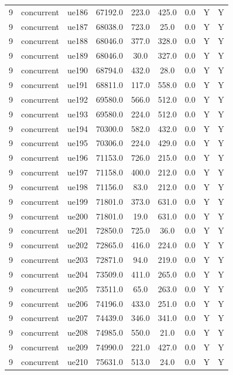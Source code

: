 \begin{table}[ht]
\begin{tabular}{|c|c|c|c|c|c|c|c|c|}
9 & concurrent & ue186 & 67192.0 & 223.0 & 425.0 & 0.0 & Y & Y \\
9 & concurrent & ue187 & 68038.0 & 723.0 & 25.0 & 0.0 & Y & Y \\
9 & concurrent & ue188 & 68046.0 & 377.0 & 328.0 & 0.0 & Y & Y \\
9 & concurrent & ue189 & 68046.0 & 30.0 & 327.0 & 0.0 & Y & Y \\
9 & concurrent & ue190 & 68794.0 & 432.0 & 28.0 & 0.0 & Y & Y \\
9 & concurrent & ue191 & 68811.0 & 117.0 & 558.0 & 0.0 & Y & Y \\
9 & concurrent & ue192 & 69580.0 & 566.0 & 512.0 & 0.0 & Y & Y \\
9 & concurrent & ue193 & 69580.0 & 224.0 & 512.0 & 0.0 & Y & Y \\
9 & concurrent & ue194 & 70300.0 & 582.0 & 432.0 & 0.0 & Y & Y \\
9 & concurrent & ue195 & 70306.0 & 224.0 & 429.0 & 0.0 & Y & Y \\
9 & concurrent & ue196 & 71153.0 & 726.0 & 215.0 & 0.0 & Y & Y \\
9 & concurrent & ue197 & 71158.0 & 400.0 & 212.0 & 0.0 & Y & Y \\
9 & concurrent & ue198 & 71156.0 & 83.0 & 212.0 & 0.0 & Y & Y \\
9 & concurrent & ue199 & 71801.0 & 373.0 & 631.0 & 0.0 & Y & Y \\
9 & concurrent & ue200 & 71801.0 & 19.0 & 631.0 & 0.0 & Y & Y \\
9 & concurrent & ue201 & 72850.0 & 725.0 & 36.0 & 0.0 & Y & Y \\
9 & concurrent & ue202 & 72865.0 & 416.0 & 224.0 & 0.0 & Y & Y \\
9 & concurrent & ue203 & 72871.0 & 94.0 & 219.0 & 0.0 & Y & Y \\
9 & concurrent & ue204 & 73509.0 & 411.0 & 265.0 & 0.0 & Y & Y \\
9 & concurrent & ue205 & 73511.0 & 65.0 & 263.0 & 0.0 & Y & Y \\
9 & concurrent & ue206 & 74196.0 & 433.0 & 251.0 & 0.0 & Y & Y \\
9 & concurrent & ue207 & 74439.0 & 346.0 & 341.0 & 0.0 & Y & Y \\
9 & concurrent & ue208 & 74985.0 & 550.0 & 21.0 & 0.0 & Y & Y \\
9 & concurrent & ue209 & 74990.0 & 221.0 & 427.0 & 0.0 & Y & Y \\
9 & concurrent & ue210 & 75631.0 & 513.0 & 24.0 & 0.0 & Y & Y \\

\end{tabular}
\end{table}
